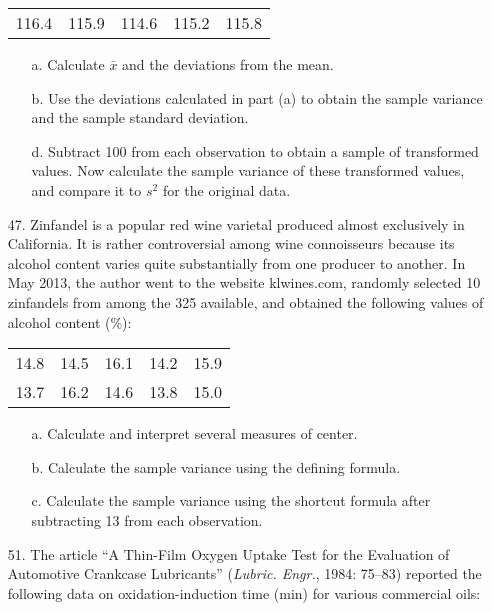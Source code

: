\documentclass[letterpaper,12pt]{article}
\begin{document}
\begin{enumerate}
    \begin{center}
      \begin{tabular}{*{5}{c}}
        116.4 & 115.9 & 114.6 & 115.2 & 115.8
      \end{tabular}
    \end{center}
    \begin{enumerate}
      \item[a.]
        Calculate $\bar{x}$ and the deviations from the mean.
      \item[b.]
        Use the deviations calculated in part (a) to obtain the sample variance and the sample standard deviation.
      \item[d.]
        Subtract 100 from each observation to obtain a sample of transformed values. Now calculate the sample variance of these transformed values, and compare it to $s^2$ for the original data.
    \end{enumerate}
  \item[47.]
    Zinfandel is a popular red wine varietal produced almost exclusively in California. It is rather controversial among wine connoisseurs because its alcohol content varies quite substantially from one producer to another. In May 2013, the author went to the website klwines.com, randomly selected 10 zinfandels from among the 325 available, and obtained the following values of alcohol content (\%):
    \begin{center}
      \begin{tabular}{*{5}{c}}
        14.8 & 14.5 & 16.1 & 14.2 & 15.9 \\
        13.7 & 16.2 & 14.6 & 13.8 & 15.0
      \end{tabular}
    \end{center}
    \begin{enumerate}
      \item[a.]
        Calculate and interpret several measures of center.
      \item[b.]
        Calculate the sample variance using the defining formula.
      \item[c.]
        Calculate the sample variance using the shortcut formula after subtracting 13 from each observation.
    \end{enumerate}
  \item[51.]
    The article ``A Thin-Film Oxygen Uptake Test for the Evaluation of Automotive Crankcase Lubricants'' (\textit{Lubric. Engr.}, 1984: 75–83) reported the following data on oxidation-induction time (min) for various commercial oils:
    \begin{center}

\end{center}
\end{enumerate}
\end{document}
